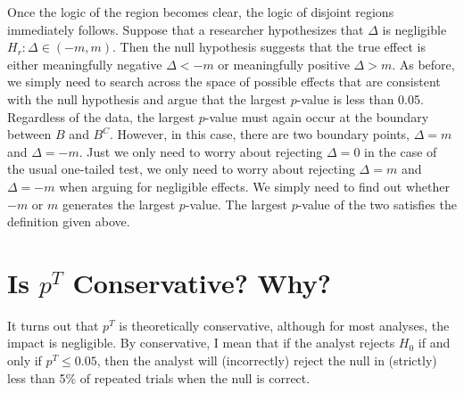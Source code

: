 \documentclass[12pt]{article}
\begin{document}
Once the logic of the region becomes clear, the logic of disjoint regions immediately follows. Suppose that a researcher hypothesizes that $\Delta$ is negligible $H_r: \Delta \in (-m, m)$. Then the null hypothesis suggests that the true effect is either meaningfully negative $\Delta < -m$ or meaningfully positive $\Delta > m$. As before, we simply need to search across the space of possible effects that are consistent with the null hypothesis and argue that the largest $p$-value is less than 0.05. Regardless of the data, the largest $p$-value must again occur at the boundary between $B$ and $B^C$. However, in this case, there are two boundary points, $\Delta = m$ and $\Delta = -m$. Just we only need to worry about rejecting $\Delta = 0$ in the case of the usual one-tailed test, we only need to worry about rejecting $\Delta = m$ and $\Delta = -m$ when arguing for negligible effects. We simply need to find out whether $-m$ or $m$ generates the largest $p$-value. The largest $p$-value of the two satisfies the definition given above.

\section*{Is $p^T$ Conservative? Why?}

It turns out that $p^T$ is theoretically conservative, although for most analyses, the impact is negligible. By conservative, I mean that if the analyst rejects $H_0$ if and only if $p^T \leq 0.05$, then the analyst will (incorrectly) reject the null in (strictly) less than 5\% of repeated trials when the null is correct.
\end{document}
